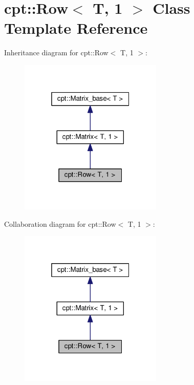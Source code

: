\hypertarget{classcpt_1_1Row_3_01T_00_011_01_4}{}\section{cpt\+:\+:Row$<$ T, 1 $>$ Class Template Reference}
\label{classcpt_1_1Row_3_01T_00_011_01_4}


Inheritance diagram for cpt\+:\+:Row$<$ T, 1 $>$\+:
\nopagebreak
\begin{figure}[H]
\begin{center}
\leavevmode
\includegraphics[width=193pt]{classcpt_1_1Row_3_01T_00_011_01_4__inherit__graph}
\end{center}
\end{figure}


Collaboration diagram for cpt\+:\+:Row$<$ T, 1 $>$\+:
\nopagebreak
\begin{figure}[H]
\begin{center}
\leavevmode
\includegraphics[width=193pt]{classcpt_1_1Row_3_01T_00_011_01_4__coll__graph}
\end{center}
\end{figure}
